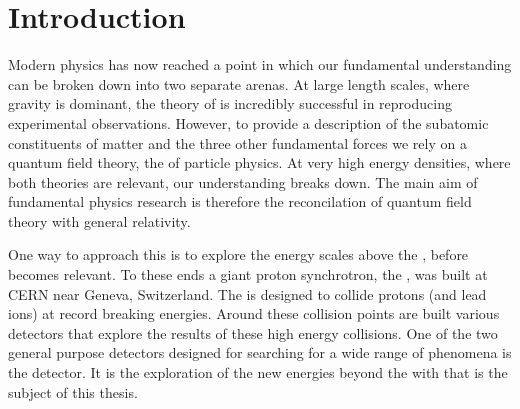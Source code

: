 \chapter{Introduction}
\label{chap:introduction}





Modern physics has now reached a point in which our fundamental
understanding can be broken down into two separate arenas. At large
length scales, where gravity is dominant, the theory of \GR is
incredibly successful in reproducing experimental observations.
However, to provide a description of the subatomic constituents of
matter and the three other fundamental forces we rely on a quantum
field theory, the \SM of particle physics. At very high
energy densities, where both theories are relevant, our understanding
breaks down. The main aim of fundamental physics research is therefore
the reconcilation of quantum field theory with general relativity. 

One way to approach this is to explore the energy scales above the
\SM, before \GR becomes relevant. To these ends a giant proton
synchrotron, the \LHC, was built at CERN near Geneva, Switzerland. The
\LHC is designed to collide protons (and lead ions) at record breaking
energies. Around these collision points are built various detectors
that explore the results of these high energy collisions. One of the
two general purpose detectors designed for searching for a wide range
of phenomena is the \CMS detector.  It is the exploration of the new
energies beyond the \SM with \CMS that is the subject of this thesis.

